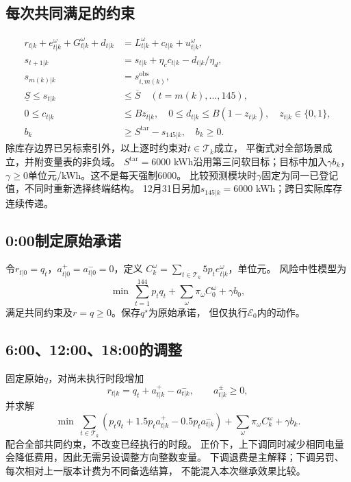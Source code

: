 \documentclass[UTF8,11pt]{ctexart}
\begin{document}
\subsection{每次共同满足的约束}
\begin{align}
 r_{t|k}+e^\omega_{t|k}+G^\omega_{t|k}+d_{t|k}
 &=L^\omega_{t|k}+c_{t|k}+u^\omega_{t|k},\label{eq:bal}\\
 s_{t+1|k}&=s_{t|k}+\eta_c c_{t|k}-d_{t|k}/\eta_d,\\
 s_{m(k)|k}&=s^{\mathrm{obs}}_{i,m(k)},\\
 \underline S\leq s_{t|k}&\leq\overline S
       \quad(t=m(k),\ldots,145),\\
 0\leq c_{t|k}&\leq Bz_{t|k},\quad
 0\leq d_{t|k}\leq B(1-z_{t|k}),\quad z_{t|k}\in\{0,1\},\\
 b_k&\geq S^{\mathrm{tar}}-s_{145|k},\quad b_k\geq0.\label{eq:end}
\end{align}
除库存边界已另标索引外，以上逐时约束对$t\in\mathcal T_k$成立，
平衡式对全部场景成立，并附变量表的非负域。
$S^{\mathrm{tar}}=6000$ kWh沿用第三问软目标；目标中加入$\gamma b_k$，
$\gamma\geq0$单位元/kWh。这不是每天强制6000。
比较预测模块时$\gamma$固定为同一已登记值，不同时重新选择终端结构。
12月31日另加$s_{145|k}=6000$ kWh；跨日实际库存连续传递。

\subsection{0:00制定原始承诺}
令$r_{t|0}=q_t$，$a^+_{t|0}=a^-_{t|0}=0$，定义
$C^\omega_k=\sum_{t\in\mathcal T_k}5p_te^\omega_{t|k}$，单位元。
风险中性模型为
\begin{equation}\label{eq:day}
 \min\ \sum_{t=1}^{144}p_tq_t+
              \sum_\omega\pi_\omega C^\omega_0+\gamma b_0,
\end{equation}
满足共同约束及$r=q\geq0$。保存$q^\star$为原始承诺，
但仅执行$\mathcal E_0$内的动作。

\subsection{6:00、12:00、18:00的调整}
固定原始$q$，对尚未执行时段增加
\begin{equation}
 r_{t|k}=q_t+a^+_{t|k}-a^-_{t|k},\qquad a^\pm_{t|k}\geq0,
\end{equation}
并求解
\begin{equation}\label{eq:roll}
 \min\ \sum_{t\in\mathcal T_k}
       (p_tq_t+1.5p_ta^+_{t|k}-0.5p_ta^-_{t|k})
       +\sum_\omega\pi_\omega C^\omega_k+\gamma b_k .
\end{equation}
配合全部共同约束，不改变已经执行的时段。
正价下，上下调同时减少相同电量会降低费用，因此无需另设调整方向整数变量。
下调退费是主解释；下调另罚、每次相对上一版本计费为不同备选结算，
不能混入本次继承效果比较。
\end{document}
